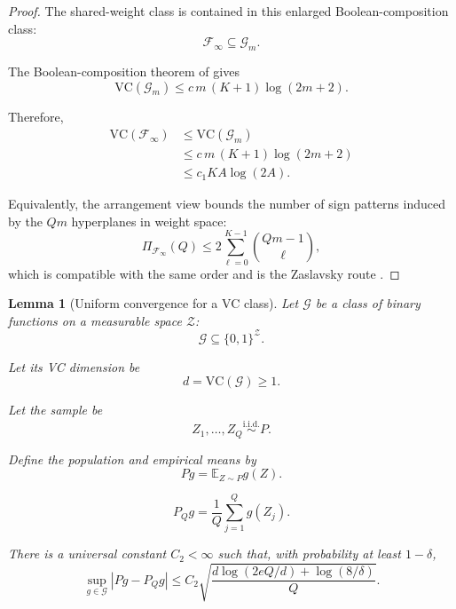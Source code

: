 \documentclass{article} %
\newtheorem{lemma}[theorem]{Lemma}
\providecommand{\Fcal}{\mathcal{F}}
\providecommand{\VC}{\mathrm{VC}}
\begin{document}
\begin{proof}
The shared-weight class is contained in this enlarged Boolean-composition class:
\begin{equation}
\label{eq:lem1-containment}
\Fcal_\infty
\subseteq
\mathcal G_m .
\end{equation}

The Boolean-composition theorem of \cite{blumer1989learnability} gives
\begin{equation}
\label{eq:lem1-blumer}
\VC(\mathcal G_m)
\le
c\,m\,(K+1)\log(2m+2).
\end{equation}

Therefore,
\begin{align}
\VC(\Fcal_\infty)
&\le
\VC(\mathcal G_m)
\label{eq:lem1-chain-a}
\\
&\le
c\,m\,(K+1)\log(2m+2)
\label{eq:lem1-chain-b}
\\
&\le
c_1 K A\log(2A).
\label{eq:lem1-chain-c}
\end{align}

Equivalently, the arrangement view bounds the number of sign patterns induced by
the \(Qm\) hyperplanes in weight space:
\begin{equation}
\label{eq:pf1-zaslavsky}
\Pi_{\Fcal_\infty}(Q)
\le
2\sum_{\ell=0}^{K-1}\binom{Qm-1}{\ell},
\end{equation}
which is compatible with the same order and is the Zaslavsky route
\cite{zaslavsky1975facing}.
\end{proof}

\begin{lemma}[Uniform convergence for a VC class]
\label{lem:2}
Let \(\mathcal G\) be a class of binary functions on a measurable space
\(\mathcal Z\):
\begin{equation}
\label{eq:lem2-class}
\mathcal G\subseteq \{0,1\}^{\mathcal Z}.
\end{equation}

Let its VC dimension be
\begin{equation}
\label{eq:lem2-d}
d=\VC(\mathcal G)\ge 1 .
\end{equation}

Let the sample be
\begin{equation}
\label{eq:lem2-sample}
Z_1,\ldots,Z_Q\stackrel{\mathrm{i.i.d.}}{\sim}P .
\end{equation}

Define the population and empirical means by
\begin{equation}
\label{eq:lem2-pop}
Pg
=
\mathbb{E}_{Z\sim P}g(Z).
\end{equation}

\begin{equation}
\label{eq:lem2-emp}
P_Qg
=
\frac{1}{Q}\sum_{j=1}^{Q} g(Z_j).
\end{equation}

There is a universal constant \(C_2<\infty\) such that, with probability at
least \(1-\delta\),
\begin{equation}
\label{eq:lem2-bound}
\sup_{g\in\mathcal G}|Pg-P_Qg|
\le
C_2
\sqrt{
\frac{
d\log(2eQ/d)+\log(8/\delta)
}{Q}
}.
\end{equation}
\end{lemma}
\end{document}
